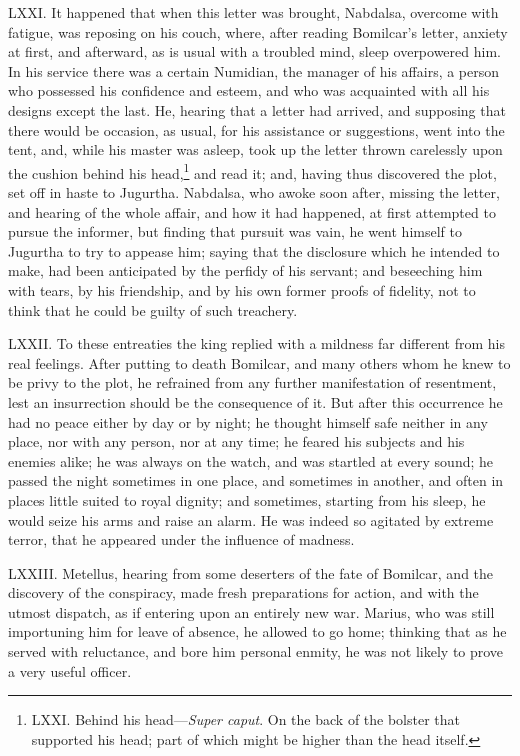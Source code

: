 LXXI. It happened that when this letter was brought, Nabdalsa,
overcome with fatigue, was reposing on his couch, where, after reading
Bomilcar's letter, anxiety at first, and afterward, as is usual with a
troubled mind, sleep overpowered him. In his service there was a
certain Numidian, the manager of his affairs, a person who possessed
his confidence and esteem, and who was acquainted with all his designs
except the last. He, hearing that a letter had arrived, and supposing
that there would be occasion, as usual, for his assistance or
suggestions, went into the tent, and, while his master was asleep,
took up the letter thrown carelessly upon the cushion behind his
head,\footnote{LXXI. Behind his head—\emph{Super caput}. On the back of the
bolster that supported his head; part of which might be higher than
the head itself.} and read it; and, having thus discovered the plot, set off
in haste to Jugurtha. Nabdalsa, who awoke soon after, missing the
letter, and hearing of the whole affair, and how it had happened, at
first attempted to pursue the informer, but finding that pursuit was
vain, he went himself to Jugurtha to try to appease him; saying that
the disclosure which he intended to make, had been anticipated by the
perfidy of his servant; and beseeching him with tears, by his
friendship, and by his own former proofs of fidelity, not to think
that he could be guilty of such treachery.

LXXII. To these entreaties the king replied with a mildness far
different from his real feelings. After putting to death Bomilcar, and
many others whom he knew to be privy to the plot, he refrained from
any further manifestation of resentment, lest an insurrection should
be the consequence of it. But after this occurrence he had no peace
either by day or by night; he thought himself safe neither in any
place, nor with any person, nor at any time; he feared his subjects
and his enemies alike; he was always on the watch, and was startled at
every sound; he passed the night sometimes in one place, and sometimes
in another, and often in places little suited to royal dignity; and
sometimes, starting from his sleep, he would seize his arms and raise
an alarm. He was indeed so agitated by extreme terror, that he
appeared under the influence of madness.

LXXIII. Metellus, hearing from some deserters of the fate of Bomilcar,
and the discovery of the conspiracy, made fresh preparations for
action, and with the utmost dispatch, as if entering upon an entirely
new war. Marius, who was still importuning him for leave of absence,
he allowed to go home; thinking that as he served with reluctance, and
bore him personal enmity, he was not likely to prove a very useful
officer.

